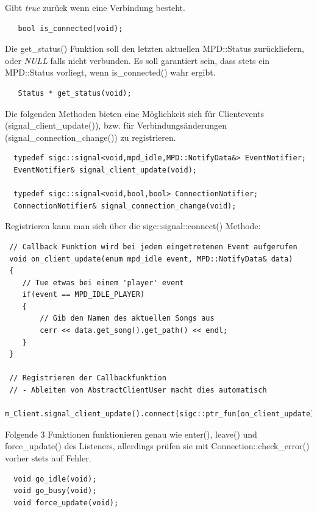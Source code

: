 Gibt \textit{true} zurück wenn eine Verbindung besteht.
\begin{verbatim}
   bool is_connected(void);
\end{verbatim}

Die get\_status() Funktion soll den letzten aktuellen MPD::Status zurückliefern,
oder \emph{NULL} falls nicht verbunden. Es soll garantiert sein, dass stets ein MPD::Status vorliegt,
wenn is\_connected() wahr ergibt.
\begin{verbatim}        
   Status * get_status(void);
\end{verbatim}

Die folgenden Methoden bieten eine Möglichkeit sich für Clientevents (signal\_client\_update()),
 bzw. für Verbindungsänderungen (signal\_connection\_change()) zu registrieren. 
\begin{verbatim}
  typedef sigc::signal<void,mpd_idle,MPD::NotifyData&> EventNotifier;
  EventNotifier& signal_client_update(void);
        
  typedef sigc::signal<void,bool,bool> ConnectionNotifier;
  ConnectionNotifier& signal_connection_change(void);
\end{verbatim}

Registrieren kann man sich über die sigc::signal::connect() Methode:
\begin{verbatim}
 // Callback Funktion wird bei jedem eingetretenen Event aufgerufen
 void on_client_update(enum mpd_idle event, MPD::NotifyData& data)
 {
    // Tue etwas bei einem 'player' event
    if(event == MPD_IDLE_PLAYER)
    {
        // Gib den Namen des aktuellen Songs aus
        cerr << data.get_song().get_path() << endl;
    }
 }

 // Registrieren der Callbackfunktion
 // - Ableiten von AbstractClientUser macht dies automatisch
 m_Client.signal_client_update().connect(sigc::ptr_fun(on_client_update));
\end{verbatim}

Folgende 3 Funktionen funktionieren genau wie enter(), leave() und force\_update() des Listeners,
allerdings prüfen sie mit Connection::check\_error() vorher stets auf Fehler.
\begin{verbatim}
  void go_idle(void);
  void go_busy(void);
  void force_update(void);
\end{verbatim}

%
%
%
%
